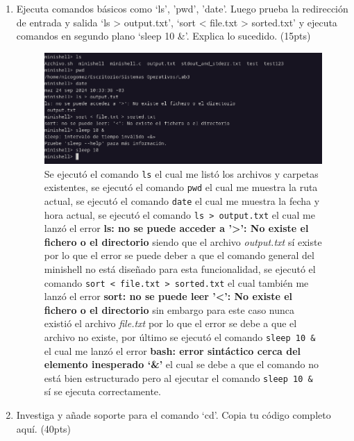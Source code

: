 \documentclass{templateNote}
\begin{document}
\begin{enumerate}
    \newpage
    \item Ejecuta comandos básicos como ‘ls’, ’pwd’, ’date’. Luego prueba la redirección de entrada y salida ‘ls > output.txt’, ‘sort < file.txt > sorted.txt’ y ejecuta comandos en segundo plano ‘sleep 10 \&’. Explica lo sucedido. (15pts)
    \begin{figure}[H]
        \centering
        \includegraphics[width=\textwidth]{img/ejerc5part3.png}
        Se ejecutó el comando \texttt{ls} el cual me listó los archivos y carpetas existentes, se ejecutó el comando \texttt{pwd} el cual me muestra la ruta actual, se ejecutó el comando \texttt{date} el cual me muestra la fecha y hora actual, se ejecutó el comando \texttt{ls > output.txt} el cual me lanzó el error \textbf{ls: no se puede acceder a '>': No existe el fichero o el directorio} siendo que el archivo \textit{output.txt} sí existe por lo que el error se puede deber a que el comando general del minishell no está diseñado para esta funcionalidad, se ejecutó el comando \texttt{sort < file.txt > sorted.txt} el cual también me lanzó el error \textbf{sort: no se puede leer '<': No existe el fichero o el directorio} sin embargo para este caso nunca existió el archivo \textit{file.txt} por lo que el error se debe a que el archivo no existe, por último se ejecutó el comando \texttt{sleep 10 \&} el cual me lanzó el error \textbf{bash: error sintáctico cerca del elemento inesperado `\&'} el cual se debe a que el comando no está bien estructurado pero al ejecutar el comando \texttt{sleep 10 \&} sí se ejecuta correctamente.
    \end{figure}
    \item Investiga y añade soporte para el comando ‘cd’. Copia tu código completo aquí. (40pts)
\end{enumerate}
\end{document}
